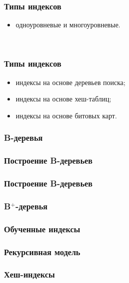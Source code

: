 \documentclass{bmstu-pr}
\begin{document}
\begin{frame}
    \frametitle{Типы индексов}

    \begin{itemize}
        \item одноуровневые и многоуровневые.
    \end{itemize}
    ~\\

    \centering{}
\end{frame}

\begin{frame}
    \frametitle{Типы индексов}

    \begin{itemize}
        \item индексы на основе деревьев поиска;
        \item индексы на основе хеш-таблиц;
        \item индексы на основе битовых карт.
    \end{itemize}

\end{frame}

\begin{frame}
    \frametitle{B-деревья}

    \centering{}
\end{frame}

\begin{frame}
    \frametitle{Построение B-деревьев}
    \centering{}
\end{frame}

\begin{frame}
    \frametitle{Построение B-деревьев}
    \centering{}
\end{frame}

\begin{frame}
    \frametitle{B$^+$-деревья}
    \centering{}
\end{frame}

\begin{frame}
    \frametitle{Обученные индексы}
    \centering{}
\end{frame}

\begin{frame}
    \frametitle{Рекурсивная модель}
    \centering{}
\end{frame}

\begin{frame}
    \frametitle{Хеш-индексы}
    \centering{}
\end{frame}
\end{document}
